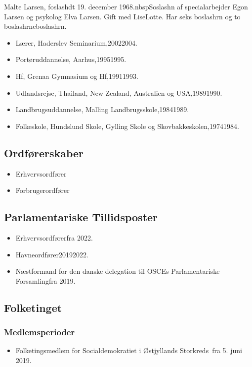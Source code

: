 \documentclass[11pt, a4paper]{awesome-cv}
\begin{document}
\makecvheader[R]
\makelettertitle
\begin{cvletter}
Malte Larsen, foslashdt 19. december 1968.nbspSoslashn af specialarbejder Egon Larsen og psykolog Elva Larsen. Gift med LiseLotte. Har seks boslashrn og to boslashrneboslashrn.

\begin{itemize}
\item Lærer, Haderslev Seminarium,20022004.
\item Portøruddannelse, Aarhus,19951995.
\item Hf, Grenaa Gymnasium og Hf,19911993.
\item Udlandsrejse, Thailand, New Zealand, Australien og USA,19891990.
\item Landbrugsuddannelse, Malling Landbrugsskole,19841989.
\item Folkeskole, Hundslund Skole, Gylling Skole og Skovbakkeskolen,19741984.
\end{itemize}
\subsection*{Ordførerskaber}
\begin{itemize}
\item Erhvervsordfører
\item Forbrugerordfører
\end{itemize}
\subsection*{Parlamentariske Tillidsposter}
\begin{itemize}
\item Erhvervsordførerfra 2022.
\item Havneordfører20192022.
\item Næstformand for den danske delegation til OSCEs Parlamentariske Forsamlingfra 2019.
\end{itemize}
\subsection*{Folketinget}
\subsubsection*{Medlemsperioder}
\begin{itemize}
\item Folketingsmedlem for Socialdemokratiet i Østjyllands Storkreds fra 5. juni 2019.
\end{itemize}

\end{cvletter}
\end{document}

